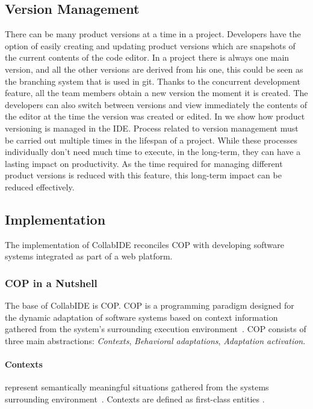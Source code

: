 \subsection{Version Management}
There can be many product versions at a time in a project. Developers have the option of easily creating and updating product versions which are snapshots of the current contents of the code editor. In a project there is always one main version, and all the other versions are derived from his one, this could be seen as the branching system that is used in git. Thanks to the concurrent development feature, all the team members obtain a new version the moment it is created. The developers can also switch between versions and view immediately the contents of the editor at the time the version was created or edited. In  we show how product versioning is managed in the IDE. Process related to version management must be carried out multiple times in the lifespan of a project. While these processes individually don’t need much time to execute, in the long-term, they can have a lasting impact on productivity. As the time required for managing different product versions is reduced with this feature, this long-term impact can be reduced effectively.

\subsection{Implementation}
\label{sec:implementation}

The implementation of CollabIDE reconciles \ac{COP} with developing software systems integrated as part of a web platform.

\subsubsection{\ac{COP} in a Nutshell}
The base of CollabIDE is \acf{COP}. \ac{COP} is a programming paradigm designed for the dynamic adaptation of software systems based on context information gathered from the system's surrounding execution environment~\cite{salvaneschi+12survey}. \ac{COP} consists of three main abstractions: \emph{Contexts}, \emph{Behavioral adaptations}, \emph{Adaptation activation}.

\paragraph{Contexts} represent semantically meaningful situations gathered from the systems surrounding environment~\cite{dey01}. Contexts are defined as first-class entities .

